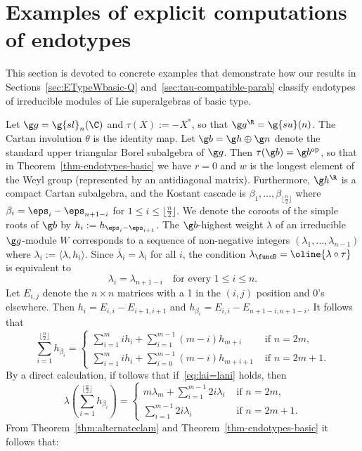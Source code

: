 \documentclass[12pt]{amsart}
\begin{document}
\section{Examples of explicit computations of endotypes}


\label{sec-examples}

This section is devoted to concrete examples that demonstrate how our results
in Sections~\ref{sec:ETypeWbasic-Q} and~\ref{sec:tau-compatible-parab}
classify  endotypes of irreducible modules of Lie superalgebras of basic type. 
\begin{ex}
Let $\g g=\g{sl}_n(\C)$ and $\tau(X):=-X^*$, so that $\g g^\R=\g{su}(n)$. The Cartan involution $\theta$ is the identity map. Let $\g b=\g h\oplus\g n$ denote the standard upper triangular Borel subalgebra of $\g g$. Then $\tau(\g b)=\g b^\mathrm{op}$, so that in Theorem~\ref{thm-endotypes-basic} we have $r=0$ and $w$ is the longest element of the Weyl group (represented by an antidiagonal matrix). Furthermore, $\g h^\R$ is a compact Cartan subalgebra, and the Kostant cascade is $\beta_1,\ldots,\beta_{\lfloor \frac{n}{2}\rfloor}$ where $\beta_i=\eps_i-\eps_{n+1-i}$ for $1\leq i\leq \lfloor \frac{n}{2}\rfloor$. We denote the coroots of the simple roots of $\g b$ by 
$h_i:=h_{\eps_i-\eps_{i+1}}$.
The $\g b$-highest weight $\lambda$ of an irreducible $\g g$-module $W$ corresponds to a sequence of non-negative integers $(\lambda_1,\ldots,\lambda_{n-1})$ where $\lambda_i:=\langle \lambda,h_i\rangle$. Since $\bar \lambda_i=\lambda_i$ for all $i$, the condition $\lambda_\funcB=\oline{\lambda\circ\tau}$ is equivalent to
\begin{equation}
\label{eq:lai=lani}
\lambda_i=\lambda_{n+1-i}\quad\text{for every }
1\leq i\leq n.
\end{equation} 
Let $ E_{i,j}$ denote the $n\times n$ matrices with a 1 in the $(i,j)$ position and 0's elsewhere. Then 
$h_i=E_{i,i}-E_{i+1,i+1}$ and $h_{\beta_i}=E_{i,i}-E_{n+1-i,n+1-i}$. It follows that 
\[
\sum_{i=1}^{\lfloor \frac{n}{2}\rfloor}h_{\beta_i}=
\begin{cases}
\sum_{i=1}^m ih_i+\sum_{i=1}^{m-1}(m-i)h_{m+i}&\text{ if }n=2m,\\[4mm]
\sum_{i=1}^m ih_i+
\sum_{i=0}^{m-1}(m-i)h_{m+i+1}&\text{ if }n=2m+1.
\end{cases}
\]
By a direct calculation, if tollows that if~\eqref{eq:lai=lani} holds, then 
\[
\textstyle \lambda\left(\sum_{i=1}^{\lfloor \frac{n}{2}\rfloor}h_{\beta_i}\right)=\begin{cases}
m\lambda_m+\sum_{i=1}^{m-1}2i\lambda_i&\text{ if }n=2m,\\
\sum_{i=1}^{m-1}2i\lambda_i&\text{ if }n=2m+1.
\end{cases}
\]
From Theorem~\ref{thm:alternateclam} and Theorem~\ref{thm-endotypes-basic} it follows that:


\end{ex}
\end{document}
